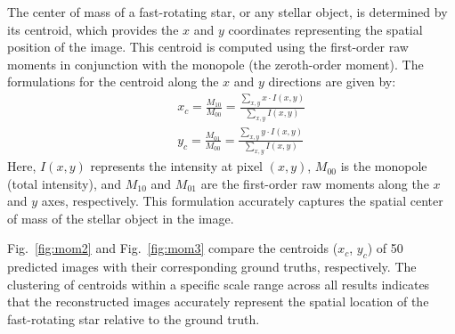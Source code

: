 
The center of mass of a fast-rotating star, or any stellar object, is determined by its centroid, which provides the $x$ and $y$ coordinates representing the spatial position of the image. This centroid is computed using the first-order raw moments in conjunction with the monopole (the zeroth-order moment). The formulations for the centroid along the $x$ and $y$ directions are given by:
\begin{eqnarray}
&&x_c = \frac{M_{10}}{M_{00}} = \frac{\sum_{x,y} x \cdot I(x,y)}{\sum_{x,y} I(x,y)} \nonumber \\
&&y_c = \frac{M_{01}}{M_{00}} = \frac{\sum_{x,y} y \cdot I(x,y)}{\sum_{x,y} I(x,y)}
\end{eqnarray}
Here, \(I(x,y)\) represents the intensity at pixel \((x,y)\), \(M_{00}\) is the monopole (total intensity), and \(M_{10}\) and \(M_{01}\) are the first-order raw moments along the $x$ and $y$ axes, respectively. This formulation accurately captures the spatial center of mass of the stellar object in the image.

Fig.~\ref{fig:mom2} and Fig.~\ref{fig:mom3} compare the centroids ($x_{c}$, $y_{c}$) of 50 predicted images with their corresponding ground truths, respectively. The clustering of centroids within a specific scale range across all results indicates that the reconstructed images accurately represent the spatial location of the fast-rotating star relative to the ground truth.

